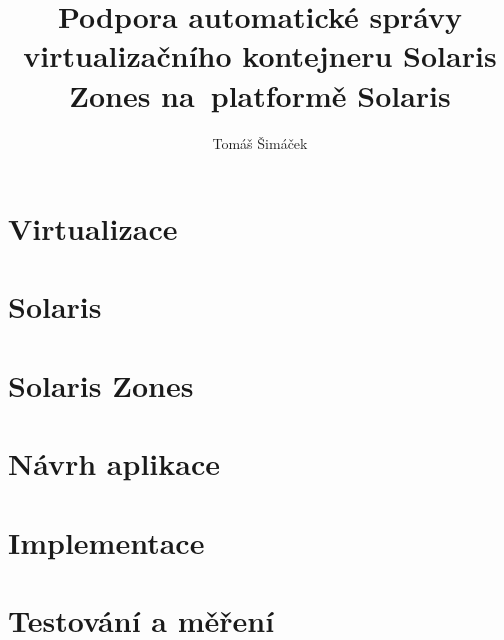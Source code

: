 \documentclass[thesis=M,czech]{FITthesis}[2012/06/26]
\title{Podpora automatické správy virtualizačního kontejneru Solaris Zones na~platformě Solaris}
\author{Tomáš Šimáček} %
\begin{document}

\begin{introduction}
  
\end{introduction}

\chapter{Virtualizace}
  
  
\chapter{Solaris}
  

\chapter{Solaris Zones}
  
  
\chapter{Návrh aplikace}
  
  
\chapter{Implementace}
  
  
\chapter{Testování a měření}
  

\begin{conclusion}
  
\end{conclusion}




\appendix
\end{document}
